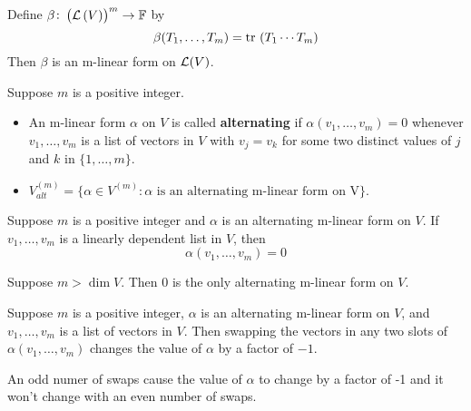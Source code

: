 \documentclass{extarticle}
\begin{document}
\begin{example}
    Define \(\beta \colon \left( \mathcal{L} \left( V \right) \right)^m \to \mathbb{F}\) by 
    \[\beta(T_1, \ldots, T_m) = \text{tr} \ (T_1 \cdots T_m)\]
    Then \(\beta\) is an m-linear form on \(\mathcal{L}(V)\).
\end{example}


\begin{definition}
    Suppose \(m\) is a positive integer. 
    \begin{itemize}
        \item An m-linear form \(\alpha\) on \(V\) is called \textbf{alternating} if \(\alpha(v_1, \ldots, v_m) = 0\) 
        whenever \(v_1, \ldots, v_m\) is a list of vectors in \(V\) with \(v_j = v_k\) for some two distinct values 
        of \(j\) and \(k\) in \(\{1, \ldots, m\}\).
        
        \item \(V_{alt}^{(m)} = \{\alpha \in V^{(m)} \colon \alpha \text{ is an alternating m-linear form on V}\}\).
    \end{itemize}
\end{definition}


\begin{corollary}
    Suppose \(m\) is a positive integer and \(\alpha\) is an alternating m-linear form on \(V\). If 
    \(v_1, \ldots, v_m\) is a linearly dependent list in \(V\), then 
    \[\alpha(v_1, \ldots, v_m) = 0\]
\end{corollary}

\begin{corollary}
    Suppose \(m  > \dim V\). Then 0 is the only alternating m-linear form on \(V\).
\end{corollary}


\begin{thm}
    Suppose \(m\) is a positive integer, \(\alpha\) is an alternating m-linear form on \(V\), and 
    \(v_1, \ldots, v_m\) is a list of vectors in \(V\). Then swapping the vectors in any two slots 
    of \(\alpha(v_1, \ldots, v_m)\) changes the value of \(\alpha\) by a factor of \(-1\).
\end{thm}

\begin{remark}
    An odd numer of swaps cause the value of \(\alpha\) to change by a factor of -1 and it won't change with 
    an even number of swaps. 
\end{remark}
\end{document}
